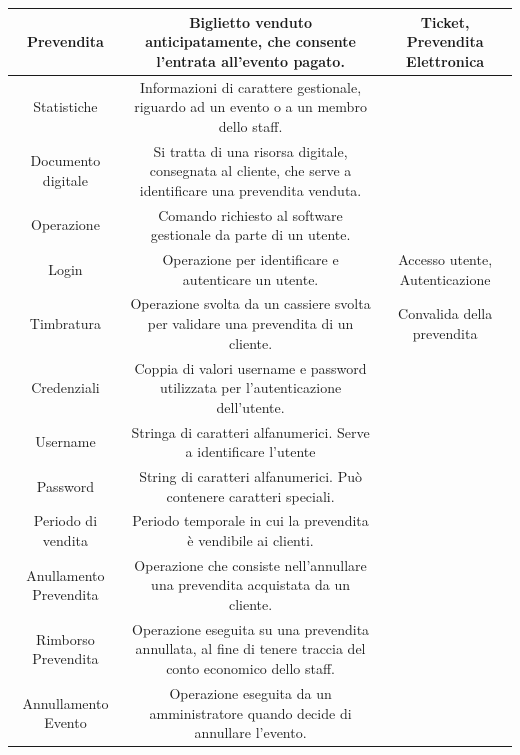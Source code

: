 \documentclass[a4paper]{article}
\begin{document}
\begin{table}[ht!]
\begin{center}
\begin{tabulary}{1\textwidth}{|c|C|C|}
        \hline
        Prevendita & Biglietto venduto anticipatamente, che consente l'entrata all'evento pagato. & Ticket, Prevendita Elettronica \\
        \hline
		Statistiche & Informazioni di carattere gestionale, riguardo ad un evento o a un membro dello staff. & \\
		\hline
		Documento digitale & Si tratta di una risorsa digitale, consegnata al cliente, che serve a identificare una prevendita venduta. & \\
		\hline
		Operazione & Comando richiesto al software gestionale da parte di un utente. & \\
		\hline
		Login & Operazione per identificare e autenticare un utente. & Accesso utente, Autenticazione \\
		\hline
		Timbratura & Operazione svolta da un cassiere svolta per validare una prevendita di un cliente. & Convalida della prevendita \\
		\hline
		Credenziali & Coppia di valori username e password utilizzata per l'autenticazione dell'utente. & \\
		\hline
		Username & Stringa di caratteri alfanumerici. Serve a identificare l'utente & \\
		\hline
		Password & String di caratteri alfanumerici. Può contenere caratteri speciali. & \\
		\hline
		Periodo di vendita & Periodo temporale in cui la prevendita è vendibile ai clienti. & \\
		\hline
		Anullamento Prevendita & Operazione che consiste nell'annullare una prevendita acquistata da un cliente. & \\
		\hline
		Rimborso Prevendita & Operazione eseguita su una prevendita annullata, al fine di tenere traccia del conto economico dello staff. & \\
		\hline
		Annullamento Evento & Operazione eseguita da un amministratore quando decide di annullare l'evento. & \\
		\hline
    \end{tabulary}
  \end{center}
\end{table}

\newpage
\end{document}
